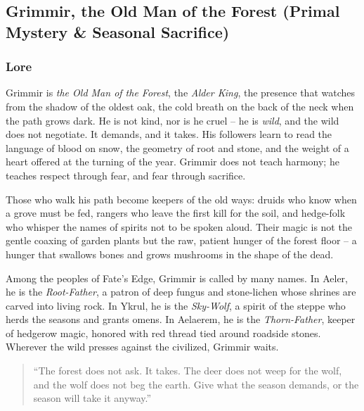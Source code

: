 
\subsection{Grimmir, the Old Man of the Forest (Primal Mystery \& Seasonal Sacrifice)}

\subsubsection*{Lore}
Grimmir is \textit{the Old Man of the Forest}, the \textit{Alder King}, the presence that watches from the shadow of the oldest oak, the cold breath on the back of the neck when the path grows dark. He is not kind, nor is he cruel -- he is \textit{wild}, and the wild does not negotiate. It demands, and it takes. His followers learn to read the language of blood on snow, the geometry of root and stone, and the weight of a heart offered at the turning of the year. Grimmir does not teach harmony; he teaches respect through fear, and fear through sacrifice.

Those who walk his path become keepers of the old ways: druids who know when a grove must be fed, rangers who leave the first kill for the soil, and hedge-folk who whisper the names of spirits not to be spoken aloud. Their magic is not the gentle coaxing of garden plants but the raw, patient hunger of the forest floor -- a hunger that swallows bones and grows mushrooms in the shape of the dead.

Among the peoples of Fate's Edge, Grimmir is called by many names. In Aeler, he is the \textit{Root-Father}, a patron of deep fungus and stone-lichen whose shrines are carved into living rock. In Ykrul, he is the \textit{Sky-Wolf}, a spirit of the steppe who herds the seasons and grants omens. In Aelaerem, he is the \textit{Thorn-Father}, keeper of hedgerow magic, honored with red thread tied around roadside stones. Wherever the wild presses against the civilized, Grimmir waits.

\begin{quote}
``The forest does not ask. It takes. The deer does not weep for the wolf, and the wolf does not beg the earth. Give what the season demands, or the season will take it anyway.''
\end{quote}

